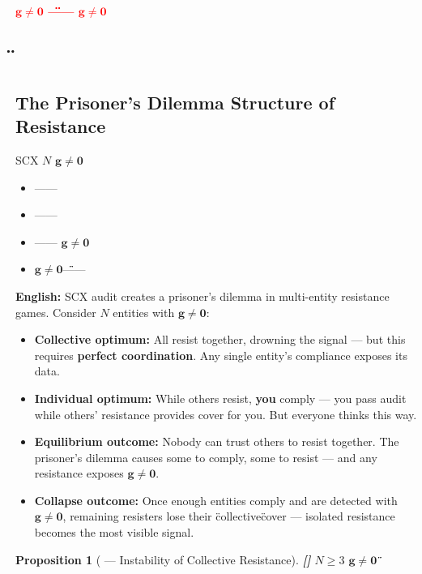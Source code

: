 \documentclass[12pt,a4paper]{article}
\newtheorem{proposition}[theorem]{Proposition}
\theoremstyle{remark}
\newcommand{\g}{\mathbf{g}}
\newcommand{\honestcrit}[1]{%
    \textcolor{red}{\textbf{#1}}%
}
\newcommand{\rigorPartial}{\textnormal{\textbf{[]}}}
\begin{document}
\honestcrit{ $ \g \neq \mathbf{0} $ \"\"—— $ \g \neq \mathbf{0} $ }

\subsection{\"\"}
\subsection{The Prisoner's Dilemma Structure of Resistance}

\vspace{4pt}
\noindent
\textbf{} SCX $ N $  $ \g \neq \mathbf{0} $ 

\begin{itemize}
    \item \textbf{} ——\textbf{}
    \item \textbf{} \textbf{}——
    \item \textbf{} —— $ \g \neq \mathbf{0} $
    \item \textbf{}  $ \g \neq \mathbf{0} $\"\"——
\end{itemize}

\vspace{4pt}
\noindent
\textbf{English:} SCX audit creates a prisoner's dilemma in multi-entity resistance games. Consider $ N $ entities with $ \g \neq \mathbf{0} $:

\begin{itemize}
    \item \textbf{Collective optimum:} All resist together, drowning the signal — but this requires \textbf{perfect coordination}. Any single entity's compliance exposes its data.
    \item \textbf{Individual optimum:} While others resist, \textbf{you} comply — you pass audit while others' resistance provides cover for you. But everyone thinks this way.
    \item \textbf{Equilibrium outcome:} Nobody can trust others to resist together. The prisoner's dilemma causes some to comply, some to resist — and any resistance exposes $ \g \neq \mathbf{0} $.
    \item \textbf{Collapse outcome:} Once enough entities comply and are detected with $ \g \neq \mathbf{0} $, remaining resisters lose their \"collective\" cover — isolated resistance becomes the most visible signal.
\end{itemize}

\begin{proposition}[ — Instability of Collective Resistance]\label{prop:instability}\rigorPartial
 $ N \geq 3 $  $ \g \neq \mathbf{0} $ \"\"
\end{proposition}
\end{document}
